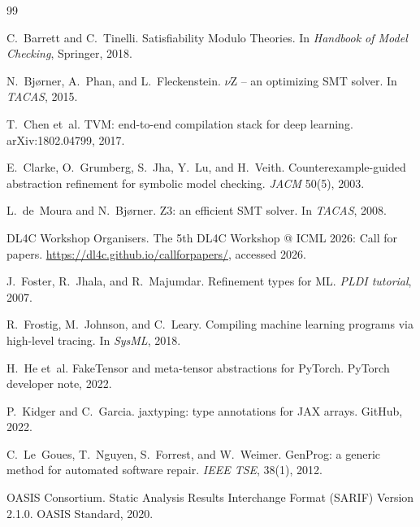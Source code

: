 \documentclass{article}
\theoremstyle{plain}
\theoremstyle{definition}
\begin{document}

\begin{thebibliography}{99}

C.~Barrett and C.~Tinelli.
\newblock Satisfiability Modulo Theories.
\newblock In \emph{Handbook of Model Checking}, Springer, 2018.

N.~Bj{\o}rner, A.~Phan, and L.~Fleckenstein.
\newblock $\nu$Z -- an optimizing SMT solver.
\newblock In \emph{TACAS}, 2015.

T.~Chen et~al.
\newblock TVM: end-to-end compilation stack for deep learning.
\newblock arXiv:1802.04799, 2017.

E.~Clarke, O.~Grumberg, S.~Jha, Y.~Lu, and H.~Veith.
\newblock Counterexample-guided abstraction refinement for symbolic
  model checking.
\newblock \emph{JACM} 50(5), 2003.

L.~de~Moura and N.~Bj{\o}rner.
\newblock Z3: an efficient SMT solver.
\newblock In \emph{TACAS}, 2008.

DL4C Workshop Organisers.
\newblock The 5th DL4C Workshop @ ICML 2026: Call for papers.
\newblock \url{https://dl4c.github.io/callforpapers/}, accessed 2026.

J.~Foster, R.~Jhala, and R.~Majumdar.
\newblock Refinement types for ML.
\newblock \emph{PLDI tutorial}, 2007.

R.~Frostig, M.~Johnson, and C.~Leary.
\newblock Compiling machine learning programs via high-level
  tracing.
\newblock In \emph{SysML}, 2018.

H.~He et~al.
\newblock FakeTensor and meta-tensor abstractions for PyTorch.
\newblock PyTorch developer note, 2022.

P.~Kidger and C.~Garcia.
\newblock jaxtyping: type annotations for JAX arrays.
\newblock GitHub, 2022.

C.~Le~Goues, T.~Nguyen, S.~Forrest, and W.~Weimer.
\newblock GenProg: a generic method for automated software repair.
\newblock \emph{IEEE TSE}, 38(1), 2012.

OASIS Consortium.
\newblock Static Analysis Results Interchange Format (SARIF) Version 2.1.0.
\newblock OASIS Standard, 2020.


\end{thebibliography}
\end{document}
